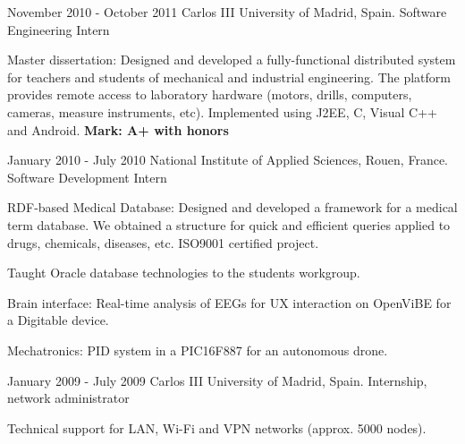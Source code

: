 \experience
  {November 2010 - October 2011}
  {Carlos III University of Madrid, Spain.}
  {Software Engineering Intern}
  {\vspace{-1em}\begin{rlist}
    \item Master dissertation: Designed and developed a fully-functional distributed system
    for teachers and students of mechanical and industrial engineering. The platform provides
    remote access to laboratory hardware (motors, drills, computers, cameras, measure
    instruments, etc). Implemented using J2EE, C, Visual C++ and Android.
    \textbf{Mark: A+ with honors}
  \end{rlist}}

\experience
  {January 2010 - July 2010}
  {National Institute of Applied Sciences, Rouen, France.}
  {Software Development Intern}
  {\vspace{-1em}\begin{rlist}
    \item RDF-based Medical Database: Designed and developed a framework for a medical
    term database. We obtained a structure for quick and efficient queries applied
    to drugs, chemicals, diseases, etc. ISO9001 certified project.
    \item Taught Oracle database technologies to the students workgroup.
    \item Brain interface: Real-time analysis of EEGs for UX interaction on OpenViBE for a Digitable device.
    \item Mechatronics: PID system in a PIC16F887 for an autonomous drone.
  \end{rlist}}

\experience
  {January 2009 - July 2009}
  {Carlos III University of Madrid, Spain.}
  {Internship, network administrator}
  {\vspace{-1em}\begin{rlist}
    \item Technical support for LAN, Wi-Fi and VPN networks (approx. 5000 nodes).
  \end{rlist}}
